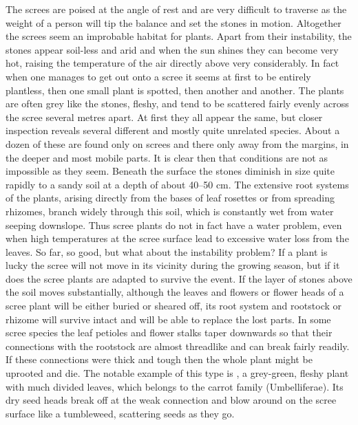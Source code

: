 The screes are poised at the angle of rest and are very difficult to traverse as the weight of a person will tip the balance and set the stones in motion.
Altogether the screes seem an improbable habitat for plants.
Apart from their instability, the stones appear soil-less and arid and when the sun shines they can become very hot, raising the temperature of the air directly above very considerably.
In fact when one manages to get out onto a scree it seems at first to be entirely plantless, then one small plant is spotted, then another and another.
The plants are often grey like the stones, fleshy, and tend to be scattered fairly evenly across the scree several metres apart.
At first they all appear the same, but closer inspection reveals several different and mostly quite unrelated species.
About a dozen of these are found only on screes and there only away from the margins, in the deeper and most mobile parts.
It is clear then that conditions are not as impossible as they seem.
Beneath the surface the stones diminish in size quite rapidly to a sandy soil at a depth of about 40--50 cm.
The extensive root systems of the plants, arising directly from the bases of leaf rosettes or from spreading rhizomes, branch widely through this soil, which is constantly wet from water seeping downslope.
Thus scree plants do not in fact have a water problem, even when high temperatures at the scree surface lead to excessive water loss from the leaves.
So far, so good, but what about the instability problem? If a plant is lucky the scree will not move in its vicinity during the growing season, but if it does the scree plants are adapted to survive the event.
If the layer of stones above the soil moves substantially, although the leaves and flowers or flower heads of a scree plant will be either buried or sheared off, its root system and rootstock or rhizome will survive intact and will be able to replace the lost parts.
In some scree species the leaf petioles and flower stalks taper downwards so that their connections with the rootstock are almost threadlike and can break fairly readily.
If these connections were thick and tough then the whole plant might be uprooted and die.
The notable example of this type is , a grey-green, fleshy plant with much divided leaves, which belongs to the carrot family (Umbelliferae).
Its dry seed heads break off at the weak connection and blow around on the scree surface like a tumbleweed, scattering seeds as they go.

